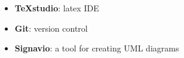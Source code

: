 \begin{itemize}
\item \textbf{TeXstudio}: latex IDE
\item \textbf{Git}: version control
\item \textbf{Signavio}: a tool for creating UML diagrams
\end{itemize}